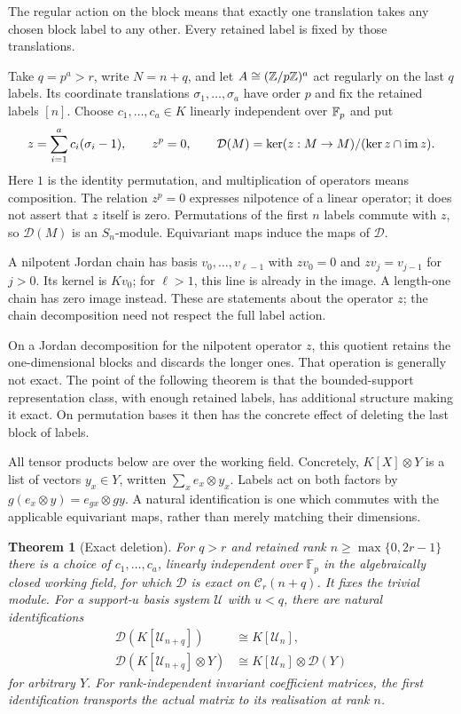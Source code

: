 \documentclass[11pt,a4paper]{article}
\newtheorem{theorem}{Theorem}[section]
\theoremstyle{definition}\newtheorem{definition}[theorem]{Definition}
\theoremstyle{remark}\newtheorem{remark}[theorem]{Remark}
\begin{document}
The regular action on the block means that exactly one translation
takes any chosen block label to any other. Every retained label is
fixed by those translations.

Take $q=p^a>r$, write $N=n+q$, and let $A\cong(\mathbb Z/p\mathbb Z)^a$ act regularly on the last $q$ labels. Its coordinate translations
$\sigma_1,\ldots,\sigma_a$ have order $p$ and fix the retained labels
$[n]$. Choose $c_1,\ldots,c_a\in K$ linearly independent over $\mathbb F_p$ and put
\[
 z=\sum_{i=1}^a c_i(\sigma_i-1),\qquad z^p=0,\qquad
 \mathcal D(M)=\ker(z:M\to M)/(\ker z\cap\operatorname{im} z).
\]
Here $1$ is the identity permutation, and multiplication of operators
means composition. The relation $z^p=0$ expresses nilpotence of a
linear operator; it does not assert that $z$ itself is zero.
Permutations of the first $n$ labels commute with $z$, so $\mathcal D(M)$ is an $S_n$-module. Equivariant maps induce the maps of $\mathcal D$.

A nilpotent Jordan chain has basis $v_0,\ldots,v_{\ell-1}$ with
$zv_0=0$ and $zv_j=v_{j-1}$ for $j>0$. Its kernel is $Kv_0$;
for $\ell>1$, this line is already in the image. A length-one chain
has zero image instead. These are statements about the operator $z$;
the chain decomposition need not respect the full label action.

On a Jordan decomposition for the nilpotent operator $z$, this quotient
retains the one-dimensional blocks and discards the longer ones. That
operation is generally not exact. The point of the following theorem is
that the bounded-support representation class, with enough retained labels,
has additional structure making it exact. On permutation bases it then
has the concrete effect of deleting the last block of labels.

All tensor products below are over the working field. Concretely,
$K[X]\otimes Y$ is a list of vectors $y_x\in Y$, written
$\sum_x e_x\otimes y_x$. Labels act on both factors by
$g(e_x\otimes y)=e_{gx}\otimes gy$. A natural identification is one
which commutes with the applicable equivariant maps, rather than merely
matching their dimensions.

\begin{theorem}[Exact deletion]\label{thm:deletion}
For $q>r$ and retained rank $n\ge\max\{0,2r-1\}$ there is a choice of $c_1,\ldots,c_a$, linearly independent over $\mathbb F_p$ in the algebraically closed working field, for which $\mathcal D$ is exact on $\mathcal C_r(n+q)$. It fixes the trivial module. For a support-$u$ basis system $\mathcal U$ with $u<q$, there are natural identifications
\begin{align}
 \mathcal D(K[\mathcal U_{n+q}])&\cong K[\mathcal U_n],\label{eq:permdelete}\\
 \mathcal D(K[\mathcal U_{n+q}]\otimes Y)&\cong
 K[\mathcal U_n]\otimes\mathcal D(Y)\label{eq:tensordelete}
\end{align}
for arbitrary $Y$. For rank-independent invariant coefficient matrices, the first identification transports the actual matrix to its realisation at rank $n$.
\end{theorem}
\end{document}

